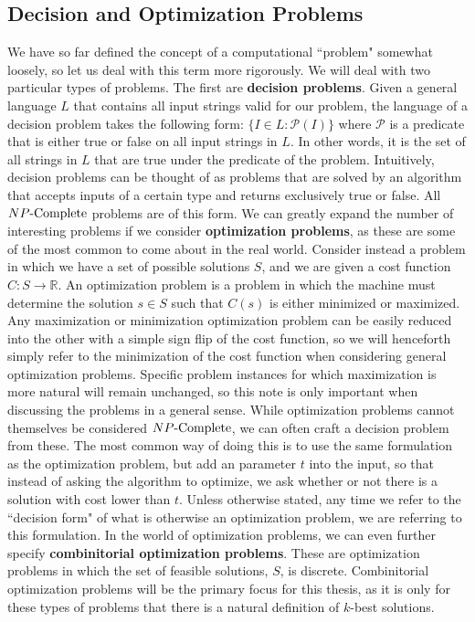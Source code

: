 \subsection{Decision and Optimization Problems}
We have so far defined the concept of a computational ``problem" somewhat loosely, so let us deal with this term more rigorously. We will deal with two particular types of problems. The first are \textbf{decision problems}. Given a general language $L$ that contains all input strings valid for our problem, the language of a decision problem takes the following form: $\{{} I \in L : \mathcal{P}(I)\}$ where $\mathcal{P}$ is a predicate that is either true or false on all input strings in $L$. In other words, it is the set of all strings in $L$ that are true under the predicate of the problem. Intuitively, decision problems can be thought of as problems that are solved by an algorithm that accepts inputs of a certain type and returns exclusively true or false. All ${NP\text{-Complete}}{}$ problems are of this form. We can greatly expand the number of interesting problems if we consider \textbf{optimization problems}, as these are some of the most common to come about in the real world. Consider instead a problem in which we have a set of possible solutions $S$, and we are given a cost function $C : S \rightarrow{} \mathbb{R}$. An optimization problem is a problem in which the machine must determine the solution $s \in S$ such that $C(s)$ is either minimized or maximized. Any maximization or minimization optimization problem can be easily reduced into the other with a simple sign flip of the cost function, so we will henceforth simply refer to the minimization of the cost function when considering general optimization problems. Specific problem instances for which maximization is more natural will remain unchanged, so this note is only important when discussing the problems in a general sense. While optimization problems cannot themselves be considered ${NP\text{-Complete}}{}$, we can often craft a decision problem from these. The most common way of doing this is to use the same formulation as the optimization problem, but add an parameter $t$ into the input, so that instead of asking the algorithm to optimize, we ask whether or not there is a solution with cost lower than $t$. Unless otherwise stated, any time we refer to the ``decision form" of what is otherwise an optimization problem, we are referring to this formulation. In the world of optimization problems, we can even further specify \textbf{combinitorial optimization problems}. These are optimization problems in which the set of feasible solutions, $S$, is discrete. Combinitorial optimization problems will be the primary focus for this thesis, as it is only for these types of problems that there is a natural definition of $k$-best solutions.
